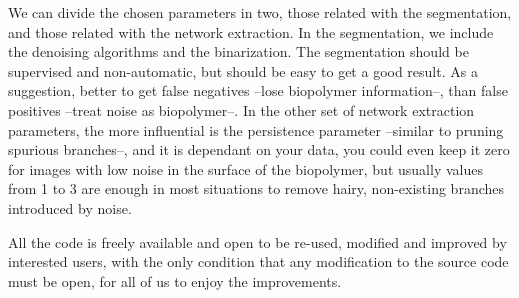 We can divide the chosen parameters in two, those related with the segmentation, and those related with the network extraction. In the segmentation, we include the denoising algorithms and the binarization. The segmentation should be supervised and non-automatic, but should be easy to get a good result. As a suggestion, better to get false negatives --lose biopolymer information--, than false positives --treat noise as biopolymer--. In the other set of network extraction parameters, the more influential is the persistence parameter --similar to pruning spurious branches--, and it is dependant on your data, you could even keep it zero for images with low noise in the surface of the biopolymer, but usually values from 1 to 3 are enough in most situations to remove hairy, non-existing branches introduced by noise.

All the code is freely available and open to be re-used, modified and improved by interested users, with the only condition that any modification to the source code must be open, for all of us to enjoy the improvements.


